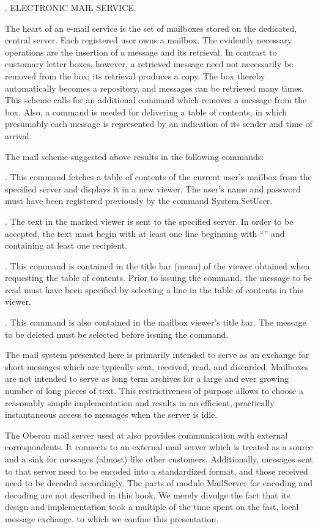 . ELECTRONIC MAIL SERVICE.

The heart of an e-mail service is the set of mailboxes stored on the dedicated, central server. Each registered user owns a mailbox. The evidently necessary operations are the insertion of a message and its retrieval. In contrast to customary letter boxes, however, a retrieved message need not necessarily be removed from the box; its retrieval produces a copy. The box thereby automatically becomes a repository, and messages can be retrieved many times. This scheme calls for an additional command which removes a message from the box. Also, a command is needed for delivering a table of contents, in which presumably each message is represented by an indication of its sender and time of arrival.

The mail scheme suggested above results in the following commands:

. This command fetches a table of contents of the current user's mailbox from the specified server and displays it in a new viewer. The user's name and password must have been registered previously by the command System.SetUser.

. The text in the marked viewer is sent to the specified server. In order to be accepted, the text must begin with at least one line beginning with ``'' and containing at least one recipient.

. This command is contained in the title bar (menu) of the viewer obtained when requesting the table of contents. Prior to issuing the command, the message to be read must have been specified by selecting a line in the table of contents in this viewer.

. This command is also contained in the mailbox viewer's title bar. The message to be deleted must be selected before issuing the command.

The mail system presented here is primarily intended to serve as an exchange for short messages which are typically sent, received, read, and discarded. Mailboxes are not intended to serve as long term archives for a large and ever growing number of long pieces of text. This restrictiveness of purpose allows to choose a reasonably simple implementation and results in an efficient, practically instantaneous access to messages when the server is idle.

The Oberon mail server used at  also provides communication with external correspondents. It connects to an external mail server which is treated as a source and a sink for messages (almost) like other customers. Additionally, messages sent to that server need to be encoded into a standardized format, and those received need to be decoded accordingly. The parts of module MailServer for encoding and decoding are not described in this book. We merely divulge the fact that its design and implementation took a multiple of the time spent on the fast, local message exchange, to which we confine this presentation.

